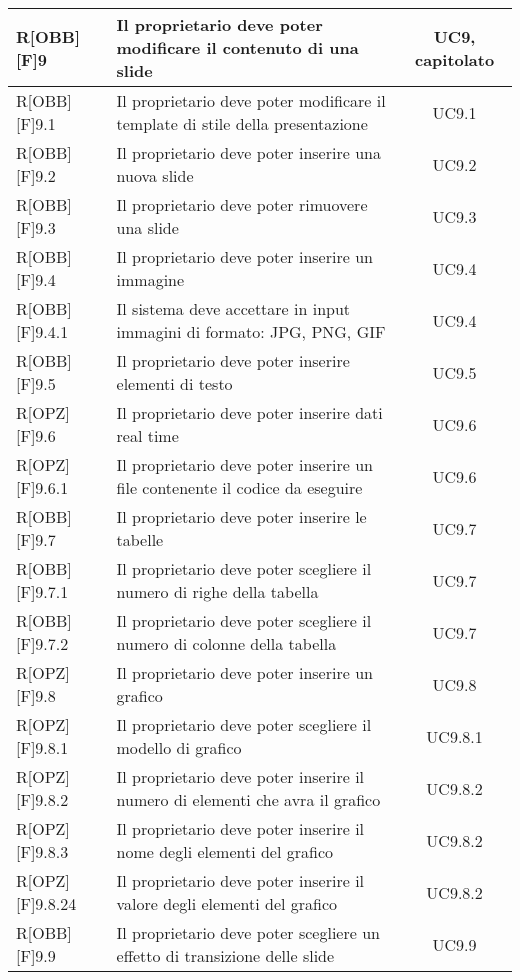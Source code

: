 \begin{center}
\begin{table}[h]
\begin{tabular}{|l|p{}|c|}
		R[OBB][F]9 & Il proprietario deve poter modificare il contenuto di una slide & UC9, capitolato \\ \midrule
		R[OBB][F]9.1 & Il proprietario deve poter modificare il template di stile della presentazione & UC9.1 \\ \midrule
		R[OBB][F]9.2 & Il proprietario deve poter inserire una nuova slide & UC9.2 \\ \midrule
		R[OBB][F]9.3 & Il proprietario deve poter rimuovere una slide & UC9.3 \\ \midrule
		R[OBB][F]9.4 & Il proprietario deve poter inserire un immagine & UC9.4 \\ \midrule
		R[OBB][F]9.4.1 & Il sistema deve accettare in input immagini di formato: JPG, PNG, GIF & UC9.4 \\ \midrule
		R[OBB][F]9.5 & Il proprietario deve poter inserire elementi di testo & UC9.5 \\ \midrule
		R[OPZ][F]9.6 & Il proprietario deve poter inserire dati real time & UC9.6 \\ \midrule
		R[OPZ][F]9.6.1 & Il proprietario deve poter inserire un file contenente il codice da eseguire  & UC9.6 \\ \midrule
		R[OBB][F]9.7 & Il proprietario deve poter inserire le tabelle & UC9.7 \\ \midrule
		R[OBB][F]9.7.1 & Il proprietario deve poter scegliere il numero di righe della tabella & UC9.7 \\ \midrule
		R[OBB][F]9.7.2 & Il proprietario deve poter scegliere il numero di colonne della tabella & UC9.7 \\ \midrule
		R[OPZ][F]9.8 & Il proprietario deve poter inserire un grafico & UC9.8 \\ \midrule
		R[OPZ][F]9.8.1 & Il proprietario deve poter scegliere il modello di grafico  & UC9.8.1 \\ \midrule
		R[OPZ][F]9.8.2 & Il proprietario deve poter inserire il numero di elementi che avra il grafico & UC9.8.2 \\ \midrule
		R[OPZ][F]9.8.3 & Il proprietario deve poter inserire il nome degli elementi del grafico  & UC9.8.2 \\ \midrule
		R[OPZ][F]9.8.24 & Il proprietario deve poter inserire il valore degli elementi del grafico & UC9.8.2 \\ \midrule
		R[OBB][F]9.9 & Il proprietario deve poter scegliere un effetto di transizione delle slide & UC9.9 \\ \midrule
		

\end{tabular}
\end{table}
\end{center}
